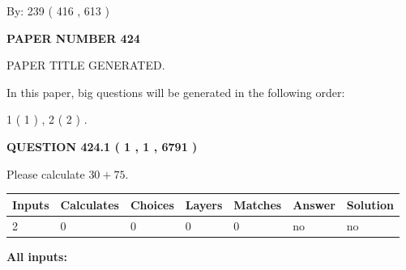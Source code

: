 \documentclass[12pt]{article}
\begin{document}
   
\hspace{1.0in} By: 
 239 ( 416 ,  613 )
   
   
   
   
\newpage 
\setcounter{page}{ 
   424001 } 
   
   
   
   
 {\textbf{ \Large{ PAPER NUMBER  424  }}}
   
   
\vspace{0.2in}
   
   
   
   
   
   
   
   
 \vspace{0.2in}
 
 
 
 
   
   
 PAPER TITLE GENERATED.
   
   
   
\vspace{0.2in}
   
In this paper, big questions will be generated in the following order: 
   
   
   1 ( 1 )
 ,
   2 ( 2 )
 .
  
\vspace{0.2in}
  
{\textbf{\Large{QUESTION
424.1 
 ( 1 , 1 , 6791 )
}}}
  
  
 
Please calculate $ %
30 +  %
75 $.
 
 
   
   
   
   
\noindent\begin{tabular}{|l|l|l|l|l|l|l|}
 \hline
Inputs & Calculates & Choices & Layers & Matches & Answer & Solution \\ \hline
 2  & 
 0  & 
 0
  & 
 0  & 
 0  & 
  no & 
  no 
  \\ \hline
 \end{tabular}
   
   
   
   
\noindent{}
   
   
   
   
\noindent\vspace{0.1in}\hspace{-0.08in} {\textbf{\Large{All inputs: }}}
   
\end{document}
